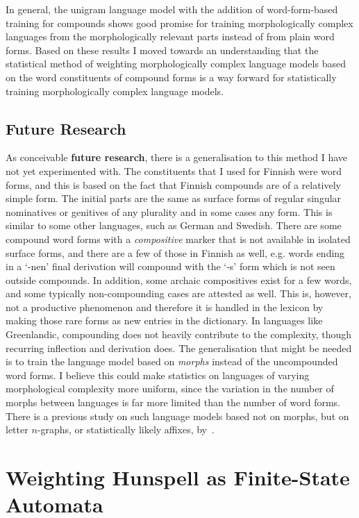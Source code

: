 \documentclass[officiallayout,final]{unihelcompling}
\begin{document}
In general, the unigram language model with the addition of word-form-based
training for compounds shows good promise for training
morphologically complex languages from the morphologically relevant parts
instead of from plain word forms. Based on these results I moved towards an 
understanding that the statistical method of weighting morphologically complex
language models based on the word constituents of compound forms is a way 
forward for statistically training morphologically complex language models.

\subsection{Future Research}

As conceivable \textbf{future research}, there is a generalisation to this
method I have not yet experimented with. The constituents that I used for
Finnish were word forms, and this is based on the fact that Finnish compounds
are of a relatively simple form. The initial parts are the same as surface
forms of regular singular nominatives or genitives of any plurality and in some
cases any form. This is similar to some other languages, such as German and
Swedish.  There are some compound word forms with a \emph{compositive} marker
that is not available in isolated surface forms, and there are a few of those
in Finnish as well, e.g.\/ words ending in a `-nen' final derivation will
compound with the `-s' form which is not seen outside compounds. In addition,
some archaic compositives exist for a few words, and some typically
non-compounding cases are attested as well. This is, however, not a productive
phenomenon and therefore it is handled in the lexicon by making those rare
forms as new entries in the dictionary.  In languages like Greenlandic,
compounding does not heavily contribute to the complexity, though recurring
inflection and derivation does. The generalisation that might be needed is to
train the language model based on \emph{morphs} instead of the uncompounded
word forms.  I believe this could make statistics on languages of varying
morphological complexity more uniform, since the variation in the number of
morphs between languages is far more limited than the number of word forms.
There is a previous study on such language models based not on morphs, but on
letter \(n\)-graphs, or statistically likely affixes,
by~\citet{creutz2005morfessor}.


\section{Weighting Hunspell as Finite-State Automata}
\label{sec:hunspell-training}
\end{document}

